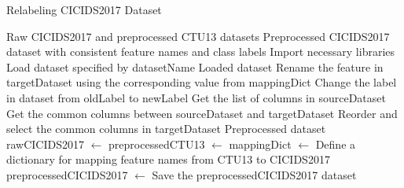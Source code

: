 \begin{algorithm}[ht]
    \caption{Relabeling CICIDS2017 Dataset}\label{alg:relabelCICIDS2017}
    \begin{algorithmic}[1]
    \Require%
    Raw CICIDS2017 and preprocessed CTU13 datasets
    \Ensure%
    Preprocessed CICIDS2017 dataset with consistent feature names and class labels
    \State%
    Import necessary libraries
        \State%
        Load dataset specified by datasetName
        \State%
        \Return%
        Loaded dataset
    \EndFunction%
                \State%
                Rename the feature in targetDataset using the corresponding value from mappingDict
            \EndIf%
        \EndFor%
    \EndFunction%
        \State%
        Change the label in dataset from oldLabel to newLabel
    \EndFunction%
        \State%
        Get the list of columns in sourceDataset
        \State%
        Get the common columns between sourceDataset and targetDataset
        \State%
        Reorder and select the common columns in targetDataset
        \State%
        \Return%
        Preprocessed dataset
    \EndFunction%
    \State%
    rawCICIDS2017 $\gets$ 
    \State%
    preprocessedCTU13 $\gets$ 
    \State%
    mappingDict $\gets$ Define a dictionary for mapping feature names from CTU13 to CICIDS2017
    \State%
    \State%
    \State%
    \State%
    preprocessedCICIDS2017 $\gets$ 
    \State%
    Save the preprocessedCICIDS2017 dataset
    \end{algorithmic}
\end{algorithm}

